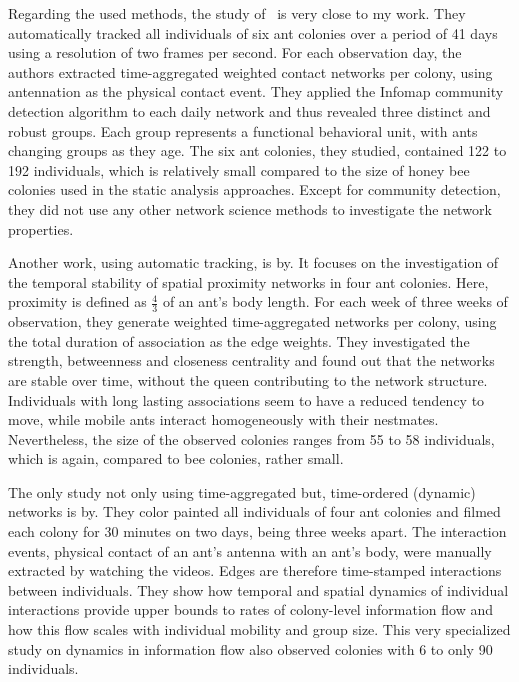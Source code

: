 Regarding the used methods, the study of~\textcite{mersch2013tracking} is very close to my work.
They automatically tracked all individuals of six ant colonies over a period of 41 days using a resolution of two frames per second.
For each observation day, the authors extracted time-aggregated weighted contact networks per colony, using antennation as the physical contact event.
They applied the Infomap community detection algorithm to each daily network and thus revealed three distinct and robust groups.
Each group represents a functional behavioral unit, with ants changing groups as they age.
The six ant colonies, they studied, contained 122 to 192 individuals, which is relatively small compared to the size of honey bee colonies used in the static analysis approaches.
Except for community detection, they did not use any other network science methods to investigate the network properties.


Another work, using automatic tracking, is by\textcite{jeanson2012long}.
It focuses on the investigation of the temporal stability of spatial proximity networks in four ant colonies.
Here, proximity is defined as $\frac{4}{3}$ of an ant’s body length.
For each week of three weeks of observation, they generate weighted time-aggregated networks per colony,  using the total duration of association as the edge weights.
They investigated the strength, betweenness and closeness centrality and found out that the networks are stable over time, without the queen contributing to the network structure.
Individuals with long lasting associations seem to have a reduced tendency to move, while mobile ants interact homogeneously with their nestmates.
Nevertheless, the size of the observed colonies ranges from 55 to 58 individuals, which is again, compared to bee colonies, rather small.


The only study not only using time-aggregated but, time-ordered (dynamic) networks is by\textcite{blonder2011time}.
They color painted all individuals of four ant colonies and filmed each colony for 30 minutes on two days, being three weeks apart.
The interaction events, physical contact of an ant's antenna with an ant's body, were manually extracted by watching the videos. Edges are therefore time-stamped interactions between individuals.
They show how temporal and spatial dynamics of individual interactions provide upper bounds to rates of colony-level information flow and how this flow scales with individual mobility and group size.
This very specialized study on dynamics in information flow also observed colonies with 6 to only 90 individuals.